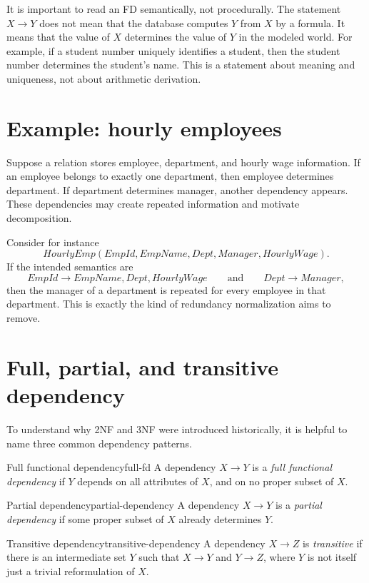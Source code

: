 \documentclass[11pt,a4paper,openany]{book}
\begin{document}
It is important to read an FD semantically, not procedurally. The statement \(X \to Y\) does not mean that the database computes \(Y\) from \(X\) by a formula. It means that the value of \(X\) determines the value of \(Y\) in the modeled world. For example, if a student number uniquely identifies a student, then the student number determines the student's name. This is a statement about meaning and uniqueness, not about arithmetic derivation.

\section{Example: hourly employees}
Suppose a relation stores employee, department, and hourly wage information. If an employee belongs to exactly one department, then employee determines department. If department determines manager, another dependency appears. These dependencies may create repeated information and motivate decomposition.

Consider for instance
\[
HourlyEmp(EmpId, EmpName, Dept, Manager, HourlyWage).
\]
If the intended semantics are
\[
EmpId \to EmpName, Dept, HourlyWage
\qquad\text{and}\qquad
Dept \to Manager,
\]
then the manager of a department is repeated for every employee in that department. This is exactly the kind of redundancy normalization aims to remove.

\section{Full, partial, and transitive dependency}
To understand why 2NF and 3NF were introduced historically, it is helpful to name three common dependency patterns.

\begin{definition}{Full functional dependency}{full-fd}
A dependency \(X \to Y\) is a \emph{full functional dependency} if \(Y\) depends on all attributes of \(X\), and on no proper subset of \(X\).
\end{definition}

\begin{definition}{Partial dependency}{partial-dependency}
A dependency \(X \to Y\) is a \emph{partial dependency} if some proper subset of \(X\) already determines \(Y\).
\end{definition}

\begin{definition}{Transitive dependency}{transitive-dependency}
A dependency \(X \to Z\) is \emph{transitive} if there is an intermediate set \(Y\) such that \(X \to Y\) and \(Y \to Z\), where \(Y\) is not itself just a trivial reformulation of \(X\).
\end{definition}
\end{document}
